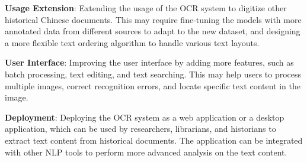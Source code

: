 \documentclass[12pt,twoside]{report}
\begin{document}
\textbf{Usage Extension}: Extending the usage of the OCR system to digitize other historical Chinese documents. This may require fine-tuning the models with more annotated data from different sources to adapt to the new dataset, and designing a more flexible text ordering algorithm to handle various text layouts.

\textbf{User Interface}: Improving the user interface by adding more features, such as batch processing, text editing, and text searching. This may help users to process multiple images, correct recognition errors, and locate specific text content in the image.

\textbf{Deployment}: Deploying the OCR system as a web application or a desktop application, which can be used by researchers, librarians, and historians to extract text content from historical documents. The application can be integrated with other NLP tools to perform more advanced analysis on the text content.
\end{document}
